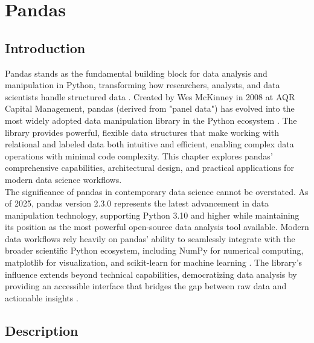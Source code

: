 %
%
%


%

\chapter{Pandas}
\label{ch:pandas}

\section{Introduction}
\label{sec:intro}

Pandas stands as the fundamental building block for data analysis and manipulation in Python, transforming how researchers, analysts, and data scientists handle structured data \cite{Pandas:2024}. Created by Wes McKinney in 2008 at AQR Capital Management, pandas (derived from "panel data") has evolved into the most widely adopted data manipulation library in the Python ecosystem \cite{McKinney:2010}. The library provides powerful, flexible data structures that make working with relational and labeled data both intuitive and efficient, enabling complex data operations with minimal code complexity. This chapter explores pandas' comprehensive capabilities, architectural design, and practical applications for modern data science workflows.\\

The significance of pandas in contemporary data science cannot be overstated. As of 2025, pandas version 2.3.0 represents the latest advancement in data manipulation technology, supporting Python 3.10 and higher while maintaining its position as the most powerful open-source data analysis tool available. Modern data workflows rely heavily on pandas' ability to seamlessly integrate with the broader scientific Python ecosystem, including NumPy for numerical computing, matplotlib for visualization, and scikit-learn for machine learning \cite{VanderPlas:2016}. The library's influence extends beyond technical capabilities, democratizing data analysis by providing an accessible interface that bridges the gap between raw data and actionable insights \cite{Pandas:Community:2023}.\\

\section{Description}
\label{sec:description}

